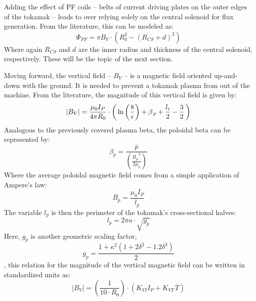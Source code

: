 Adding the effect of PF coils -- belts of current driving plates on the outer edges of the tokamak -- leads to  over relying solely on the central solenoid for flux generation. From the literature, this can be modeled as: \cite{hartmann}
\begin{equation}
	\label{eq:phipf}
	\Phi_{PF} = \pi B_V \cdot \left( R_0^2 - ( R_{CS} + d ) ^ 2 \right)
\end{equation}
Where again $R_{CS}$ and $d$ are the inner radius and thickness of the central solenoid, respectively. These will be the topic of the next section.

Moving forward, the vertical field -- $B_V$ -- is a magnetic field oriented up-and-down with the ground. It is needed to prevent a tokamak plasma from  out of the machine. From the literature, the magnitude of this vertical field  is given by: \cite{process}
\begin{equation}
  |B_V| = \frac{\mu_0 I_P}{4 \pi R_0} \cdot \left( \,\textnormal{ln} \left(\frac{8}{\epsilon}\right) + \beta_{\,p} + \frac{l_i}{2} - \frac{3}{2} \, \right)
\end{equation}
Analogous to the previously covered plasma beta, the poloidal beta can be represented by: \cite{elongation}
\begin{equation}
  \beta_p = \frac{\overline{p}}{\left( \frac{\overline{B_p}^{\,2}}{2 \mu_0} \right)}
\end{equation}
Where the average poloidal magnetic field comes from a simple application of Ampere's law:
\begin{equation}
	\overline{B_p} = \frac{\mu_0 I_P}{l_p}
\end{equation}
The variable $l_p$ is then the perimeter of the tokamak's cross-sectional halves:
\begin{equation}
	l_p = 2 \pi a \cdot \sqrt{g_p}
\end{equation}
Here, $g_p$ is another geometric scaling factor,
\begin{equation}
  g_p = \frac{1 + \kappa^2 ( 1 + 2 \delta^2 - 1.2\delta^3 )}{2}
\end{equation}
, this relation for the magnitude of the vertical magnetic field can be written in standardized units as:
\begin{equation}
	|B_V| = \left( \frac{ 1 }{ 10 \cdot R_0} \right) \cdot \left( K_{VI} I_P +  K_{VT\,} \overline{T}  \right)
\end{equation}
